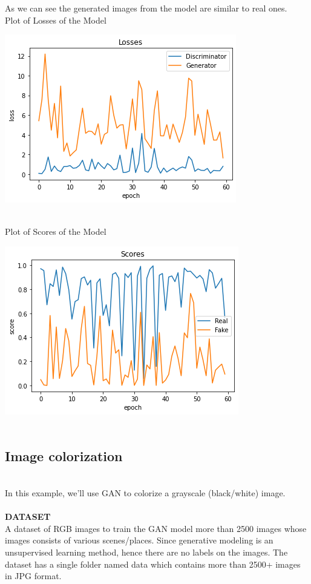 \documentclass[14pt]{article}
\begin{document}
As we can see the generated images from the model are similar to real ones. 
\\
Plot of Losses of the Model
\\
\begin{center}
    \includegraphics[width = 7 cm ]{26.png}
    \\ \\ 
\end{center}
Plot of Scores of the Model
\\
\begin{center}
    \includegraphics[width = 7 cm ]{27.png}
    \\ \\ 
\end{center}
\subsection{Image colorization}
\\
In this example, we’ll use GAN to colorize a grayscale (black/white) image.\\
\\
\textbf{DATASET}
\\
A dataset of RGB images to train the GAN model more than 2500 images whose images consists of various scenes/places.  Since generative modeling is an unsupervised learning method, hence there are no labels on the images. The dataset has a single folder named data which contains more than 2500+ images in JPG format.
\\
\end{document}
